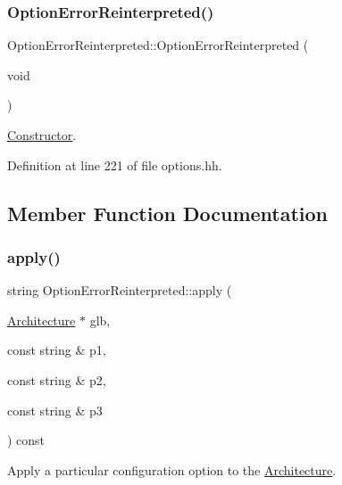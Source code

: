 \subsubsection{\texorpdfstring{OptionErrorReinterpreted()}{OptionErrorReinterpreted()}}
{\footnotesize\ttfamily Option\+Error\+Reinterpreted\+::\+Option\+Error\+Reinterpreted (\begin{DoxyParamCaption}\item[{void}]{ }\end{DoxyParamCaption})\hspace{0.3cm}{\ttfamily [inline]}}



\mbox{\hyperlink{class_constructor}{Constructor}}. 



Definition at line 221 of file options.\+hh.



\subsection{Member Function Documentation}
\mbox{\label{class_option_error_reinterpreted_a62b6697ee1cc195531f65cd383f6c3d7}} 
\subsubsection{\texorpdfstring{apply()}{apply()}}
{\footnotesize\ttfamily string Option\+Error\+Reinterpreted\+::apply (\begin{DoxyParamCaption}\item[{\mbox{\hyperlink{class_architecture}{Architecture}} $\ast$}]{glb,  }\item[{const string \&}]{p1,  }\item[{const string \&}]{p2,  }\item[{const string \&}]{p3 }\end{DoxyParamCaption}) const\hspace{0.3cm}{\ttfamily [virtual]}}



Apply a particular configuration option to the \mbox{\hyperlink{class_architecture}{Architecture}}. 

